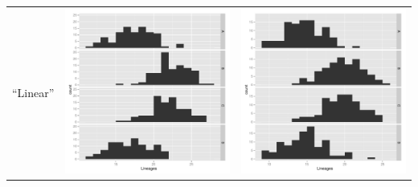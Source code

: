 \documentclass[11pt,t]{beamer}
\begin{document}
\begin{frame}
\begin{table}[htdp]
\begin{center}
\begin{tabular}{l|c|c|}
\hline
``Linear''	& \includegraphics[scale=0.15]{results-lineages-linear-d0.pdf}		  & \includegraphics[scale=0.15]{results-lineages-linear-d1.pdf} 		\\
	

\end{tabular}
\end{center}
\label{default}
\end{table}%

\end{frame}
\end{document}
